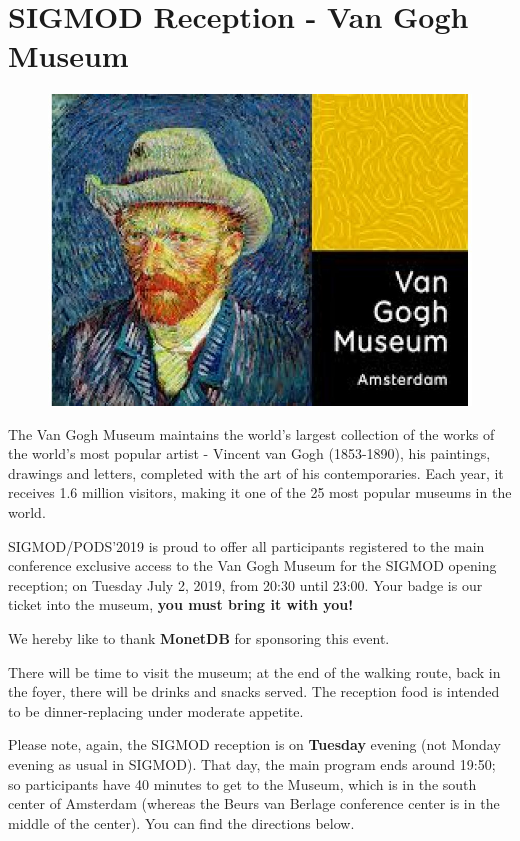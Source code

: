 
\clearpage
\ifodd\value{page}\hbox{}\newpage\fi

\section{SIGMOD Reception - Van Gogh Museum}

\begin{figure}[h]
\centering
\includegraphics[width=.5\textwidth]{images/reception/vangogh.jpeg}
\end{figure}


The Van Gogh Museum maintains the world's largest collection of the works of the world's most popular artist - Vincent van Gogh (1853-1890), his paintings, drawings and letters, completed with the art of his contemporaries. Each year, it receives 1.6 million visitors, making it one of the 25 most popular museums in the world.

SIGMOD/PODS'2019 is proud to offer all participants registered to the main conference exclusive access to the Van Gogh Museum for the SIGMOD opening reception; on Tuesday July 2, 2019, from 20:30 until 23:00.
Your badge is our ticket into the museum, \textbf{you must bring it with you!}

We hereby like to thank \textbf{MonetDB} for sponsoring this event.


There will be time to visit the museum; at the end of the walking route, back in the foyer, there will be drinks and snacks served. The reception food is intended to be dinner-replacing under moderate appetite.

Please note, again, the SIGMOD reception is on \textbf{Tuesday} evening (not Monday evening as usual in SIGMOD). That day, the main program ends around 19:50; so participants have 40 minutes to get to the Museum, which is in the south center of Amsterdam (whereas the Beurs van Berlage conference center is in the middle of the center). You can find the directions below.



